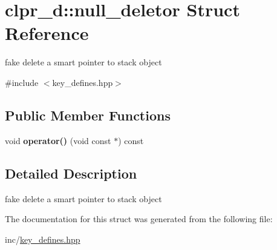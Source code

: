 \hypertarget{structclpr__d_1_1null__deletor}{\section{clpr\-\_\-d\-:\-:null\-\_\-deletor \-Struct \-Reference}
\label{structclpr__d_1_1null__deletor}
}


fake delete a smart pointer to stack object  




{\ttfamily \#include $<$key\-\_\-defines.\-hpp$>$}

\subsection*{\-Public \-Member \-Functions}
\begin{DoxyCompactItemize}
\item 
\hypertarget{structclpr__d_1_1null__deletor_a1291090f78585207516520a2eddbd033}{void {\bfseries operator()} (void const $\ast$) const }\label{structclpr__d_1_1null__deletor_a1291090f78585207516520a2eddbd033}

\end{DoxyCompactItemize}


\subsection{\-Detailed \-Description}
fake delete a smart pointer to stack object 

\-The documentation for this struct was generated from the following file\-:\begin{DoxyCompactItemize}
\item 
inc/\hyperlink{key__defines_8hpp}{key\-\_\-defines.\-hpp}\end{DoxyCompactItemize}
